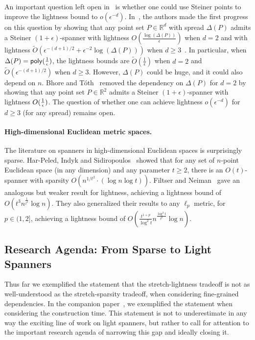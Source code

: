 An important question left open in~\cite{LS19} is whether one could use Steiner points to improve the lightness bound to $o(\epsilon^{-d})$.
In~\cite{LS20}, the authors made  the first progress on this question by showing that  any point set $P \in \mathbb{R}^d$ with spread $\Delta(P)$ admits a Steiner $(1+\epsilon)$-spanner with lightness $O(\frac{\log (\Delta(P))}{\epsilon})$ when $d = 2$ and with lightness $\tilde{O}(\epsilon^{-(d+1)/2} + \epsilon^{-2} \log (\Delta(P)))$ when $d\geq 3$~\cite{LS20}. In particular, when $\Delta(P) = \mathsf{poly}(\frac{1}{\epsilon})$, the lightness bounds are $\tilde{O}(\frac{1}{\epsilon})$ when $d = 2$ and $\tilde{O}(\epsilon^{-(d+1)/2})$ when $d \geq 3$.  However, $\Delta(P)$ could be huge, and it could also depend on $n$. Bhore and T\'{o}th~\cite{BT21} removed the dependency on $\Delta(P)$ for   $d=2$ by showing that any point set $P \in \mathbb{R}^2$ admits a Steiner  $(1+\epsilon)$-spanner with lightness $O(\frac{1}{\epsilon})$. 
The question of whether one can achieve lightness $o(\epsilon^{-d})$ for $d \geq 3$ (for any spread) remains open.

\paragraph{High-dimensional Euclidean metric spaces.~} 
The literature on spanners in high-dimensional Euclidean spaces is surprisingly sparse.
Har-Peled, Indyk and Sidiropoulos~\cite{HIS13} showed that for any set of $n$-point Euclidean space (in any dimension) 
and any parameter $t \geq 2$, there is an $O(t)$-spanner with sparsity $O(n^{1/t^2} \cdot (\log n \log t))$.  Filtser and Neiman~\cite{FN18} gave an analogous but weaker result for lightness, achieving a lightness bound of $O(t^3 n^{\frac{1}{t^2}}\log n)$. They also generalized their results to any $\ell_p$ metric, for $p \in (1,2]$, achieving a lightness bound of $O(\frac{t^{1+p}}{\log^2 t}n^{\frac{\log^2 t}{t^p}}\log n)$.  

\subsection{Research Agenda: From Sparse to Light Spanners}

Thus far we exemplified the statement that the stretch-lightness tradeoff is not as well-understood as the stretch-sparsity tradeoff,
when considering {fine-grained dependencies}. In the companion paper~\cite{LS21}, we exemplified the statement when considering the construction time.  This statement is not to underestimate in any way the exciting line of work on light spanners,
but rather to call for attention to the important research agenda of narrowing this gap and ideally closing it.

